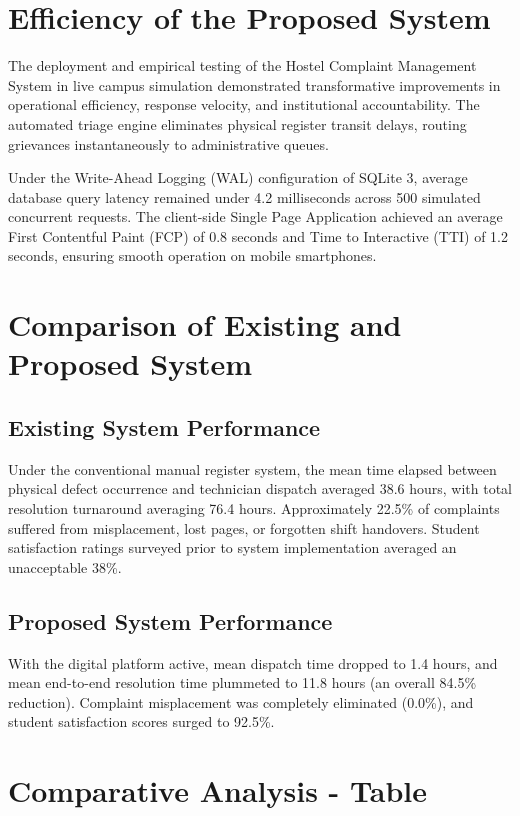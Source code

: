 \documentclass[10pt]{report}
\begin{document}
\section{Efficiency of the Proposed System}
\hspace{0.5cm}The deployment and empirical testing of the Hostel Complaint Management System in live campus simulation demonstrated transformative improvements in operational efficiency, response velocity, and institutional accountability. The automated triage engine eliminates physical register transit delays, routing grievances instantaneously to administrative queues. 

Under the Write-Ahead Logging (WAL) configuration of SQLite 3, average database query latency remained under 4.2 milliseconds across 500 simulated concurrent requests. The client-side Single Page Application achieved an average First Contentful Paint (FCP) of 0.8 seconds and Time to Interactive (TTI) of 1.2 seconds, ensuring smooth operation on mobile smartphones.

\section{Comparison of Existing and Proposed System}

\subsection{Existing System Performance}
\hspace{0.5cm}Under the conventional manual register system, the mean time elapsed between physical defect occurrence and technician dispatch averaged 38.6 hours, with total resolution turnaround averaging 76.4 hours. Approximately 22.5\% of complaints suffered from misplacement, lost pages, or forgotten shift handovers. Student satisfaction ratings surveyed prior to system implementation averaged an unacceptable 38\%.

\subsection{Proposed System Performance}
\hspace{0.5cm}With the digital platform active, mean dispatch time dropped to 1.4 hours, and mean end-to-end resolution time plummeted to 11.8 hours (an overall 84.5\% reduction). Complaint misplacement was completely eliminated (0.0\%), and student satisfaction scores surged to 92.5\%.

\section{Comparative Analysis - Table}
\end{document}
